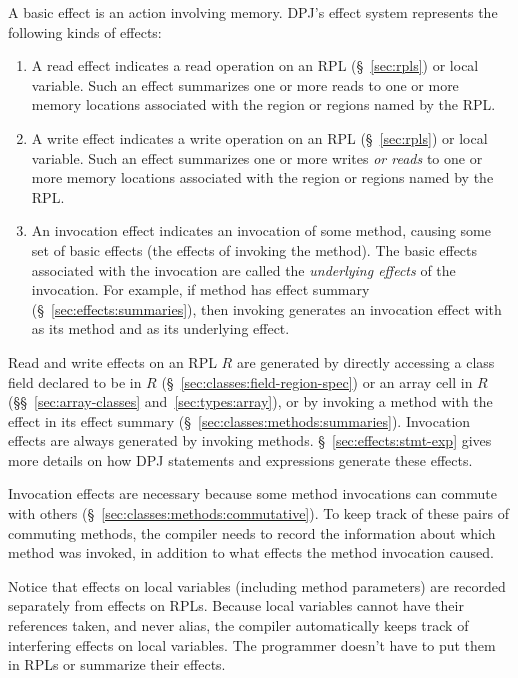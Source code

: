 A basic effect is an action involving memory.  DPJ's effect system
represents the following kinds of effects:
%
\begin{enumerate}
%
\item {} A read effect indicates a read operation
  on an RPL (\S~\ref{sec:rpls}) or local variable.  Such an effect
  summarizes one or more reads to one or more memory locations
  associated with the region or regions named by the RPL.
%
\item {} A write effect indicates a write operation
  on an RPL (\S~\ref{sec:rpls}) or local variable.  Such an effect
  summarizes one or more writes \emph{or reads} to one or more memory
  locations associated with the region or regions named by the RPL.
%
\item {} An invocation effect indicates an
  invocation of some method, causing some set of basic effects (the
  effects of invoking the method).  The basic effects associated with
  the invocation are called the \emph{underlying effects} of the
  invocation.  For example, if method  has effect summary
   (\S~\ref{sec:effects:summaries}), then invoking
   generates an invocation effect with  as its method
  and  as its underlying effect.
%
\end{enumerate}

Read and write effects on an RPL $R$ are generated by directly
accessing a class field declared to be in $R$
(\S~\ref{sec:classes:field-region-spec}) or an array cell in $R$
(\S\S~\ref{sec:array-classes} and~\ref{sec:types:array}), or by
invoking a method with the effect in its effect summary
(\S~\ref{sec:classes:methods:summaries}).  Invocation effects are
always generated by invoking methods.  \S~\ref{sec:effects:stmt-exp}
gives more details on how DPJ statements and expressions generate
these effects.

Invocation effects are necessary because some method invocations can
commute with others (\S~\ref{sec:classes:methods:commutative}).  To
keep track of these pairs of commuting methods, the compiler needs to
record the information about which method was invoked, in addition to
what effects the method invocation caused.

Notice that effects on local variables (including method parameters)
are recorded separately from effects on RPLs.  Because local variables
cannot have their references taken, and never alias, the compiler
automatically keeps track of interfering effects on local variables.
The programmer doesn't have to put them in RPLs or summarize their
effects.

